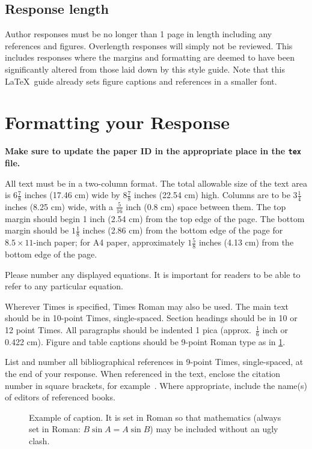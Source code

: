 \documentclass[10pt,twocolumn,letterpaper]{article}
\begin{document}
\subsection{Response length}
Author responses must be no longer than 1 page in length including any references and figures.
Overlength responses will simply not be reviewed.
This includes responses where the margins and formatting are deemed to have been significantly altered from those laid down by this style guide.
Note that this \LaTeX\ guide already sets figure captions and references in a smaller font.


\section{Formatting your Response}

{\bf Make sure to update the paper ID in the appropriate place in the \verb+tex+ file.}

All text must be in a two-column format.
The total allowable size of the text area is $6\frac78$ inches (17.46 cm) wide by $8\frac78$ inches (22.54 cm) high.
Columns are to be $3\frac14$ inches (8.25 cm) wide, with a $\frac{5}{16}$ inch (0.8 cm) space between them.
The top margin should begin 1 inch (2.54 cm) from the top edge of the page.
The bottom margin should be $1\frac{1}{8}$ inches (2.86 cm) from the bottom edge of the page for $8.5 \times 11$-inch paper;
for A4 paper, approximately $1\frac{5}{8}$ inches (4.13 cm) from the bottom edge of the page.

Please number any displayed equations.
It is important for readers to be able to refer to any particular equation.

Wherever Times is specified, Times Roman may also be used.
The main text should be in 10-point Times, single-spaced.
Section headings should be in 10 or 12 point Times.
All paragraphs should be indented 1 pica (approx.\ $\frac{1}{6}$ inch or 0.422 cm).
Figure and table captions should be 9-point Roman type as in \cref{fig:onecol}.


List and number all bibliographical references in 9-point Times, single-spaced,
at the end of your response.
When referenced in the text, enclose the citation number in square brackets, for example~\cite{Alpher05}.
Where appropriate, include the name(s) of editors of referenced books.

\begin{figure}[t]
  \centering
  \fbox{\rule{0pt}{0.5in} \rule{0.9\linewidth}{0pt}}
   \caption{Example of caption.  It is set in Roman so that mathematics
   (always set in Roman: $B \sin A = A \sin B$) may be included without an
   ugly clash.}
   \label{fig:onecol}
\end{figure}
\end{document}
